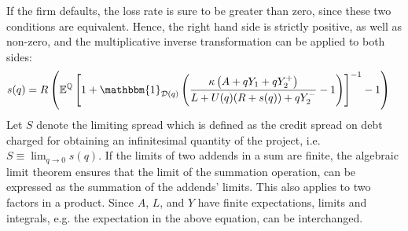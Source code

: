 \documentclass[../main.tex]{subfiles}
\begin{document}
        If the firm defaults, the loss rate is sure to be greater than zero,
        since these two conditions are equivalent. 
        Hence, the right hand side is strictly positive, as well as non-zero,
        and the multiplicative inverse transformation can be applied to both sides:
            \begin{align}
                    s(q)
                &=
                    \grossrfrate
                    \left(
                        \mathbb{E}^{\rnmeasure}\left[
                            1
                            +
                            \mathbbm{1}_{\mathcal{D}(q)}
                            \left(
                                \frac{
                                    \kappa 
                                    \left(
                                        A + q Y_{1} + q Y_{2}^{+}
                                    \right)
                                }{
                                    L 
                                    +
                                    U(q)
                                    (\grossrfrate + s(q))
                                    +
                                    q Y_{2}^{-} 
                                }
                                -
                                1
                            \right) 
                        \right]^{-1}
                        - 
                        1
                    \right)
                \nonumber
            \end{align}
        Let $S$ denote the limiting spread which is defined as the credit spread on debt 
        charged for obtaining an infinitesimal quantity of the project, i.e.
        $S \equiv \lim_{q\rightarrow 0} s(q)$.
        If the limits of two addends in a sum are finite, 
        the algebraic limit theorem ensures that the limit of the summation operation,
        can be expressed as the summation of the addends' limits.
        This also applies to two factors in a product.
        Since $A$, $L$, and $Y$ have finite expectations,
        limits and integrals, e.g. the expectation in the above equation, can be interchanged.
\end{document}
